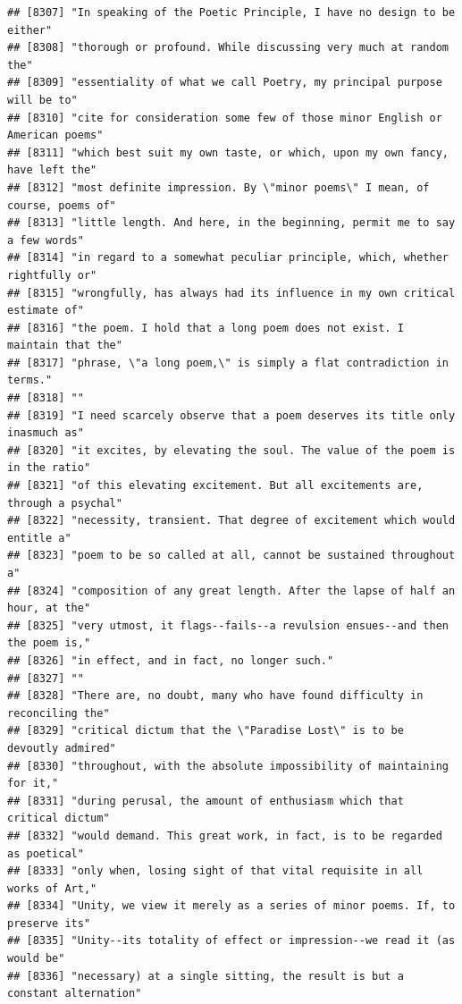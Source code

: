 \documentclass{article}\usepackage[]{graphicx}\usepackage[]{color}
\makeatletter
\newenvironment{kframe}{%
 \def\at@end@of@kframe{}%
 \ifinner\ifhmode%
  \def\at@end@of@kframe{\end{minipage}}%
  \begin{minipage}{\columnwidth}%
 \fi\fi%
 \def\FrameCommand##1{\hskip\@totalleftmargin \hskip-\fboxsep
 \colorbox{shadecolor}{##1}\hskip-\fboxsep
     \hskip-\linewidth \hskip-\@totalleftmargin \hskip\columnwidth}%
 \MakeFramed {\advance\hsize-\width
   \@totalleftmargin\z@ \linewidth\hsize
   \@setminipage}}%
 {\par\unskip\endMakeFramed%
 \at@end@of@kframe}
\newenvironment{knitrout}{}{} %
\makeatother
\begin{document}
\begin{knitrout}
\begin{kframe}
\begin{verbatim}
## [8307] "In speaking of the Poetic Principle, I have no design to be either"          
## [8308] "thorough or profound. While discussing very much at random the"              
## [8309] "essentiality of what we call Poetry, my principal purpose will be to"        
## [8310] "cite for consideration some few of those minor English or American poems"    
## [8311] "which best suit my own taste, or which, upon my own fancy, have left the"    
## [8312] "most definite impression. By \"minor poems\" I mean, of course, poems of"    
## [8313] "little length. And here, in the beginning, permit me to say a few words"     
## [8314] "in regard to a somewhat peculiar principle, which, whether rightfully or"    
## [8315] "wrongfully, has always had its influence in my own critical estimate of"     
## [8316] "the poem. I hold that a long poem does not exist. I maintain that the"       
## [8317] "phrase, \"a long poem,\" is simply a flat contradiction in terms."           
## [8318] ""                                                                            
## [8319] "I need scarcely observe that a poem deserves its title only inasmuch as"     
## [8320] "it excites, by elevating the soul. The value of the poem is in the ratio"    
## [8321] "of this elevating excitement. But all excitements are, through a psychal"    
## [8322] "necessity, transient. That degree of excitement which would entitle a"       
## [8323] "poem to be so called at all, cannot be sustained throughout a"               
## [8324] "composition of any great length. After the lapse of half an hour, at the"    
## [8325] "very utmost, it flags--fails--a revulsion ensues--and then the poem is,"     
## [8326] "in effect, and in fact, no longer such."                                     
## [8327] ""                                                                            
## [8328] "There are, no doubt, many who have found difficulty in reconciling the"      
## [8329] "critical dictum that the \"Paradise Lost\" is to be devoutly admired"        
## [8330] "throughout, with the absolute impossibility of maintaining for it,"          
## [8331] "during perusal, the amount of enthusiasm which that critical dictum"         
## [8332] "would demand. This great work, in fact, is to be regarded as poetical"       
## [8333] "only when, losing sight of that vital requisite in all works of Art,"        
## [8334] "Unity, we view it merely as a series of minor poems. If, to preserve its"    
## [8335] "Unity--its totality of effect or impression--we read it (as would be"        
## [8336] "necessary) at a single sitting, the result is but a constant alternation"    

\end{verbatim}
\end{kframe}
\end{knitrout}
\end{document}
